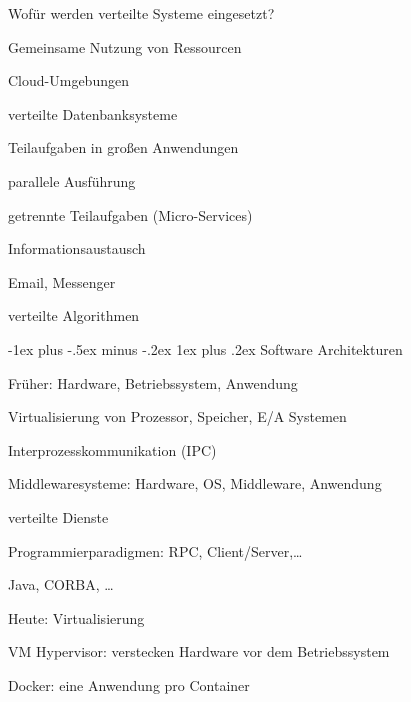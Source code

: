 \documentclass[10pt]{article}
\makeatletter
\renewcommand{\subsubsection}{\@startsection{subsubsection}{3}{0mm}%
                                {-1ex plus -.5ex minus -.2ex}%
                                {1ex plus .2ex}%
                                {\normalfont\small\bfseries}}
\makeatother
\begin{document}
  Wofür werden verteilte Systeme eingesetzt? 
  \begin{itemize*}
    \item Gemeinsame Nutzung von Ressourcen
    \begin{itemize*}
      \item Cloud-Umgebungen
      \item verteilte Datenbanksysteme
    \end{itemize*}
    \item Teilaufgaben in großen Anwendungen
    \begin{itemize*}
      \item parallele Ausführung
      \item getrennte Teilaufgaben (Micro-Services)
    \end{itemize*}
    \item Informationsaustausch
    \begin{itemize*}
      \item Email, Messenger
      \item verteilte Algorithmen
    \end{itemize*}
  \end{itemize*}
  
  \subsubsection{Software Architekturen}
  \begin{enumerate*}
    \item Früher: Hardware, Betriebssystem, Anwendung
    \begin{itemize*}
      \item Virtualisierung von Prozessor, Speicher, E/A Systemen
      \item Interprozesskommunikation (IPC)
    \end{itemize*}
    \item Middlewaresysteme: Hardware, OS, Middleware, Anwendung
    \begin{itemize*}
      \item verteilte Dienste
      \item Programmierparadigmen: RPC, Client/Server,…
      \item Java, CORBA, …
    \end{itemize*}
    \item Heute: Virtualisierung
    \begin{itemize*}
      \item VM Hypervisor: verstecken Hardware vor dem Betriebssystem
      \item Docker: eine Anwendung pro Container
    \end{itemize*}
  \end{enumerate*}
  
\end{document}
